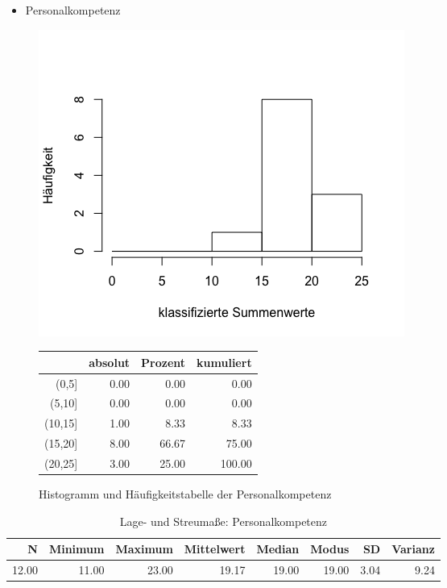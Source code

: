 \documentclass[12pt, bibliography=totoc]{scrartcl}
\begin{document}
\begin{itemize}
\tightlist
\item
  Personalkompetenz
\end{itemize}

\begin{figure}[H]
\begin{minipage}{.5\linewidth}
\includegraphics[width=1.0\linewidth]{Anhang/PKHistn.png}

\label{pic:aufbau}
\end{minipage}
\begin{minipage}{.5\linewidth}
\centering
\raisebox{\depth}
{\begin{tabular}{rrrr}
  \hline
 & absolut & Prozent & kumuliert \\
  \hline
(0,5] & 0.00 & 0.00 & 0.00 \\
  (5,10] & 0.00 & 0.00 & 0.00 \\
  (10,15] & 1.00 & 8.33 & 8.33 \\
  (15,20] & 8.00 & 66.67 & 75.00 \\
  (20,25] & 3.00 & 25.00 & 100.00 \\
   \hline
\end{tabular}

}
\label{tab:defis}
\end{minipage}
\caption{Histogramm und Häufigkeitstabelle der Personalkompetenz}
\end{figure}

\begin{table}[H]
\centering
\caption{Lage- und Streumaße: Personalkompetenz}
\begin{tabular}{rrrrrrrr}
  \hline
  N & Minimum & Maximum & Mittelwert & Median & Modus & SD & Varianz \\
  \hline
  12.00 & 11.00 & 23.00 & 19.17 & 19.00 & 19.00 & 3.04 & 9.24 \\
   \hline
\end{tabular}
\end{table}
\end{document}
